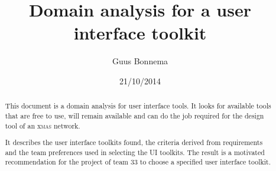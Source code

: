 \documentclass[a4paper,11pt,draft]{article}
\author{Guus Bonnema}
\date{21/10/2014}
\title{Domain analysis for a user interface toolkit}
\begin{document}

\newcommand{\xmas}{x\textsc{mas}}%
\newcommand{\ok}{$\checkmark$}

\newcommand{\mybox}[1]{\begin{boxedminipage}[t]{\textwidth}#1\end{boxedminipage}}


\newcommand\secformat[1]{%
    {\fontsize{60}{60}\selectfont\thesection}%
    \ifthenelse{\equal{\thesection}{}}{}{\quad\rule[-8pt]{2pt}{40pt}\quad}
    \parbox[b]{.7\textwidth}{\filright\bfseries #1}}%
\titleformat{\section}[block]
    {\filright\normalfont\sffamily}{}{0pt}{\secformat}
[1pc]

\maketitle

\begin{abstract}

	\noindent{} This document is a domain analysis for user interface tools. It
	looks for available tools that are free to use, will remain available and
	can do the job required for the design tool of an \xmas{} network.

	\noindent{} It describes the user interface toolkits found, the criteria
	derived from requirements and the team preferences used in selecting the UI
	toolkits. The result is a motivated recommendation for the project of team
	33 to choose a specified user interface toolkit.

\end{abstract}

\tableofcontents




\end{document}
